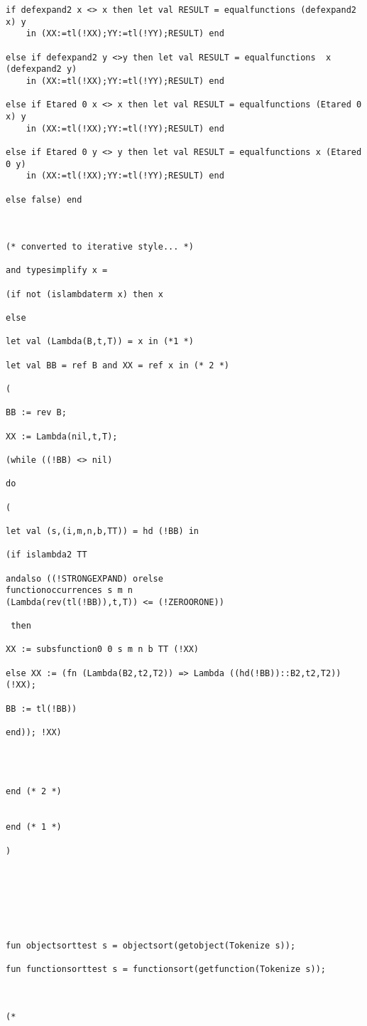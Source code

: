 \documentclass[12pt]{article}
\begin{document}
\begin{verbatim}
if defexpand2 x <> x then let val RESULT = equalfunctions (defexpand2 x) y
    in (XX:=tl(!XX);YY:=tl(!YY);RESULT) end

else if defexpand2 y <>y then let val RESULT = equalfunctions  x (defexpand2 y) 
    in (XX:=tl(!XX);YY:=tl(!YY);RESULT) end

else if Etared 0 x <> x then let val RESULT = equalfunctions (Etared 0 x) y
    in (XX:=tl(!XX);YY:=tl(!YY);RESULT) end

else if Etared 0 y <> y then let val RESULT = equalfunctions x (Etared 0 y) 
    in (XX:=tl(!XX);YY:=tl(!YY);RESULT) end

else false) end



(* converted to iterative style... *)

and typesimplify x = 

(if not (islambdaterm x) then x

else 

let val (Lambda(B,t,T)) = x in (*1 *)

let val BB = ref B and XX = ref x in (* 2 *)

(

BB := rev B;

XX := Lambda(nil,t,T);

(while ((!BB) <> nil)

do

(

let val (s,(i,m,n,b,TT)) = hd (!BB) in

(if islambda2 TT

andalso ((!STRONGEXPAND) orelse 
functionoccurrences s m n 
(Lambda(rev(tl(!BB)),t,T)) <= (!ZEROORONE))

 then 

XX := subsfunction0 0 s m n b TT (!XX)

else XX := (fn (Lambda(B2,t2,T2)) => Lambda ((hd(!BB))::B2,t2,T2)) (!XX);

BB := tl(!BB))

end)); !XX)




end (* 2 *)


end (* 1 *)

)





 

fun objectsorttest s = objectsort(getobject(Tokenize s));

fun functionsorttest s = functionsort(getfunction(Tokenize s));



(*

\end{verbatim}
\end{document}
